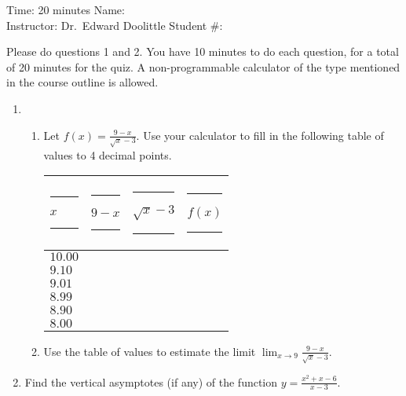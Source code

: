 \documentclass[12pt]{article}
\newcommand{\ds}{\displaystyle}
\begin{document}
\thispagestyle{plain}

\begin{flushleft}
Time:  20 minutes                \hfill       Name: \underline{\hspace{2in}} \\
Instructor: Dr.\ Edward Doolittle \hfill Student \#: \underline{\hspace{2in}}
\end{flushleft}

\noindent
Please do questions 1 and 2.  You have 10 minutes
to do each question, for a total of 20
minutes for the quiz.  A non-programmable
calculator of the type mentioned in the course outline is allowed.

\begin{enumerate}
\item 
  \begin{enumerate}
  \item Let
    $\ds f(x)=\frac{9-x}{\sqrt{x}-3}$.
    Use your calculator to 
    fill in the following table of values to 4 decimal points.
    \begin{center}
      \begin{tabular}{|l|l|l|l|}
        \hline
	\rule{10pt}{0pt}$x$\rule{10pt}{0pt}     
	  & \rule{10pt}{0pt}\rule{0pt}{12pt}$9-x$\rule{10pt}{0pt}
	  & \rule{10pt}{0pt}$\sqrt{x}-3$\rule{10pt}{0pt}
	  & \rule{20pt}{0pt}$f(x)$\rule{20pt}{0pt} \\
	\hline
	\rule{0pt}{12pt}$10.00$ &              &        &        \\
	\hline
	\rule{0pt}{12pt}$9.10$  &              &        &        \\
	\hline
	\rule{0pt}{12pt}$9.01$  &              &        &        \\
	\hline
	\rule{0pt}{12pt}$8.99$  &              &        &        \\
	\hline
	\rule{0pt}{12pt}$8.90$  &              &        &        \\
	\hline
	\rule{0pt}{12pt}$8.00$  &              &        &        \\
	\hline
      \end{tabular}
    \end{center}
  \item Use the table of values to estimate the limit
    $\displaystyle\lim_{x\to 9} \frac{9-x}{\sqrt{x}-3}$.
  \end{enumerate}
\newpage
\item Find the vertical asymptotes (if any) of 
  the function $\displaystyle y = \frac{x^2+x-6}{x-3}$.
\end{enumerate}
\end{document}
